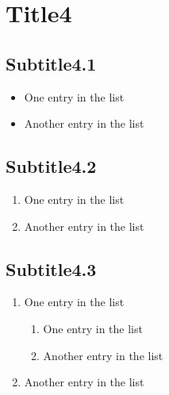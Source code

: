 \documentclass{uc3mpracticas}
\begin{document}
  \section{Title4}
    \subsection{Subtitle4.1}

      \begin{itemize}
        \item One entry in the list
        \item Another entry in the list
      \end{itemize}

    \subsection{Subtitle4.2}

      \begin{enumerate}
        \item One entry in the list
        \item Another entry in the list
      \end{enumerate}

    \subsection{Subtitle4.3}

      \begin{enumerate}
        \item One entry in the list
        \begin{enumerate}
          \item One entry in the list
          \item Another entry in the list
        \end{enumerate}
        \item Another entry in the list
      \end{enumerate}
\end{document}
